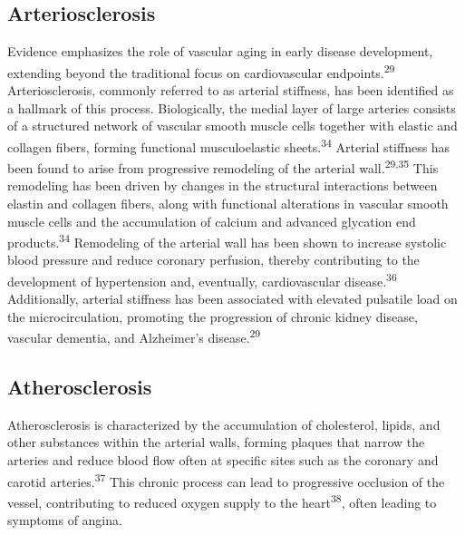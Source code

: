 \documentclass[
  letterpaper,
  headsepline=true,
  open=any]{scrbook}
\begin{document}
\hypertarget{arteriosclerosis}{%
\subsection{Arteriosclerosis}\label{arteriosclerosis}}

Evidence emphasizes the role of vascular aging in early disease
development, extending beyond the traditional focus on cardiovascular
endpoints.\textsuperscript{29} Arteriosclerosis, commonly referred to as
arterial stiffness, has been identified as a hallmark of this process.
Biologically, the medial layer of large arteries consists of a
structured network of vascular smooth muscle cells together with elastic
and collagen fibers, forming functional musculoelastic
sheets.\textsuperscript{34} Arterial stiffness has been found to arise
from progressive remodeling of the arterial wall.\textsuperscript{29,35}
This remodeling has been driven by changes in the structural
interactions between elastin and collagen fibers, along with functional
alterations in vascular smooth muscle cells and the accumulation of
calcium and advanced glycation end products.\textsuperscript{34}
Remodeling of the arterial wall has been shown to increase systolic
blood pressure and reduce coronary perfusion, thereby contributing to
the development of hypertension and, eventually, cardiovascular
disease.\textsuperscript{36} Additionally, arterial stiffness has been
associated with elevated pulsatile load on the microcirculation,
promoting the progression of chronic kidney disease, vascular dementia,
and Alzheimer's disease.\textsuperscript{29}

\hypertarget{atherosclerosis}{%
\subsection{Atherosclerosis}\label{atherosclerosis}}

Atherosclerosis is characterized by the accumulation of cholesterol,
lipids, and other substances within the arterial walls, forming plaques
that narrow the arteries and reduce blood flow often at specific sites
such as the coronary and carotid arteries.\textsuperscript{37} This
chronic process can lead to progressive occlusion of the vessel,
contributing to reduced oxygen supply to the heart\textsuperscript{38},
often leading to symptoms of angina.
\end{document}
